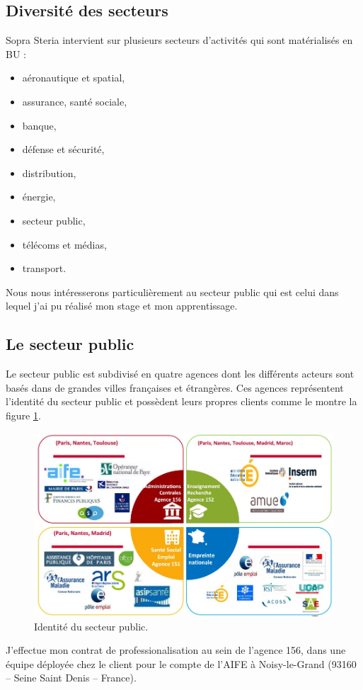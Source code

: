 \documentclass[12pt,a4paper]{article}
\begin{document}
\subsection{Diversité des secteurs}
Sopra Steria intervient sur plusieurs secteurs d’activités qui sont matérialisés en \gls{BU} :
\smallbreak
\begin{itemize}
\item aéronautique et spatial,
\item assurance, santé sociale,
\item banque,
\item défense et sécurité,
\item distribution,
\item énergie,
\item secteur public,
\item télécoms et médias,
\item transport.
\end{itemize}
\medbreak
Nous nous intéresserons particulièrement au secteur public qui est celui dans lequel j'ai pu réalisé mon stage et mon apprentissage.
\subsection{Le secteur public}
Le secteur public est subdivisé en quatre agences dont les différents acteurs sont basés dans de grandes villes françaises et étrangères. Ces agences représentent l'identité du secteur public et possèdent leurs propres clients comme le montre la figure \ref{agences}.
\begin{figure}[H]
	\begin{center}
		\includegraphics[width=\textwidth,keepaspectratio]{identiteSecteurPublic.png}
		\caption{Identité du secteur public.}
		\label{agences}
	\end{center}
\end{figure}
J’effectue mon contrat de professionalisation au sein de l'agence 156, dans une équipe déployée chez le client pour le compte de l’\gls{AIFE} à Noisy-le-Grand (93160 – Seine Saint Denis – France).
\newpage
\clearpage
\end{document}
